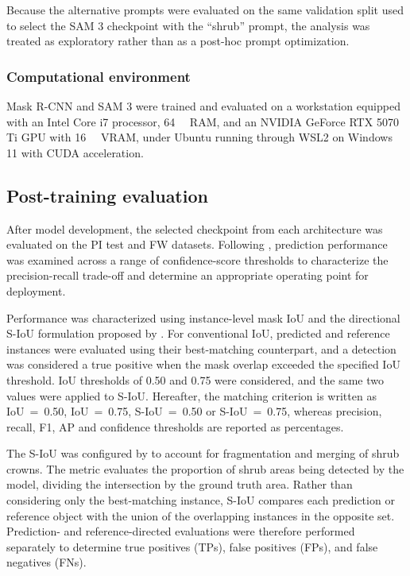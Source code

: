 \documentclass[12pt,a4paper]{article}
\begin{document}
Because the alternative prompts were evaluated on the same validation split used to select the SAM 3 checkpoint with the ``shrub'' prompt, the analysis was treated as exploratory rather than as a post-hoc prompt optimization.

\subsubsection{Computational environment}

Mask R-CNN and SAM 3 were trained and evaluated on a workstation equipped with an Intel Core i7 processor, \qty{64}{\giga\byte} RAM, and an NVIDIA GeForce RTX 5070 Ti GPU with \qty{16}{\giga\byte} VRAM, under Ubuntu running through WSL2 on Windows 11 with CUDA acceleration.

\subsection{Post-training evaluation}\label{sec:post_training_ev}

After model development, the selected checkpoint from each architecture was evaluated on the PI test and FW datasets. Following \citet{khaldi2024individual}, prediction performance was examined across a range of confidence-score thresholds to characterize the precision-recall trade-off and determine an appropriate operating point for deployment.

Performance was characterized using instance-level mask IoU and the directional S-IoU formulation proposed by \citet{khaldi2024individual}. For conventional IoU, predicted and reference instances were evaluated using their best-matching counterpart, and a detection was considered a true positive when the mask overlap exceeded the specified IoU threshold. IoU thresholds of 0.50 and 0.75 were considered, and the same two values were applied to S-IoU. Hereafter, the matching criterion is written as IoU~=~0.50, IoU~=~0.75, S-IoU~=~0.50 or S-IoU~=~0.75, whereas precision, recall, F1, AP and confidence thresholds are reported as percentages.

The S-IoU was configured by \citet{khaldi2024individual} to account for fragmentation and merging of shrub crowns. The metric evaluates the proportion of shrub areas being detected by the model, dividing the intersection by the ground truth area. Rather than considering only the best-matching instance, S-IoU compares each prediction or reference object with the union of the overlapping instances in the opposite set. Prediction- and reference-directed evaluations were therefore performed separately to determine true positives (TPs), false positives (FPs), and false negatives (FNs).
\end{document}
